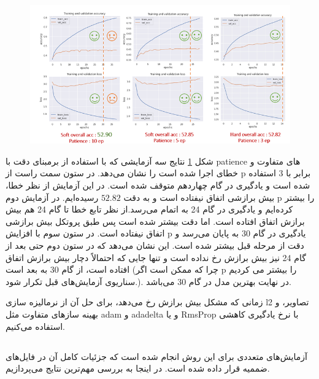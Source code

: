 {{		   \begin{figure}[H]
		   	\centering
		   	\includegraphics[scale=0.7]{images/i3.png}
		   	\caption{}
		   	\label{fig:10}
		   \end{figure}
	   
		   شکل
		   \ref{fig:10}
		  نتایج سه آزمایشی که با استفاده از 
		   برمبنای دقت با patience های متفاوت و خطای 
		   اجرا شده است را نشان می‌دهد. در ستون سمت راست از p برابر با 3 استفاده شده است و یادگیری در گام چهاردهم متوقف شده است. در این آزمایش از نظر خطا، بیش برازشی اتفاق نیفتاده است و به دقت
		   $ 52.82 $
		   رسیده‌ایم. در آزمایش دوم p را بیشتر کرده‌ایم و یادگیری در گام 24 به اتمام می‌رسد.از نظر تابع خطا تا گام 24 هم بیش برازش اتفاق افتاده است. اما دقت بیشتر شده است پس طبق پروتکل بیش برازشی اتفاق نیفتاده است. در ستون سوم با افزایش p یادگیری در گام 30 به پایان می‌رسد و دقت از مرحله قبل  بیشتر شده است. این نشان می‌دهد که در ستون دوم حتی بعد از گام 24 نیز بیش برازش رخ نداده است و تنها جایی که احتمالاً دچار بیش برازش اتفاق افتاده است، از گام 30 به بعد است (چرا که ممکن است اگر p را بیشتر می کردیم سناریوی آزمایش‌های قبل تکرار شود.). در نهایت  بهترین مدل در گام 30 می‌باشد.
		   
 زمانی که مشکل بیش برازش رخ می‌دهد، برای حل آن از نرمالیزه سازی l2 تصاویر، 
   و بهینه سازهای متفاوت مثل adam و adadelta  و یا RmsProp‌ با نرخ یادگیری کاهشی استفاده می‌کنیم.
		   
		  
		
	}
	\subsection{}
	{
		آزمایش‌های متعددی برای این روش انجام شده است که جزئیات کامل آن در فایل‌های ضممیه قرار داده شده است. در اینجا به بررسی مهم‌ترین نتایج می‌پردازیم. 
		
}}
